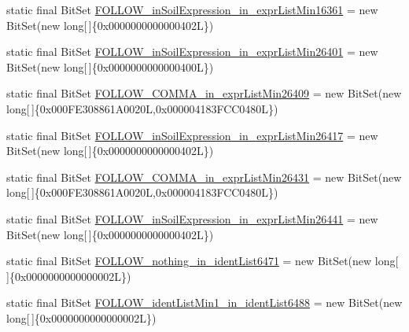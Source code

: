 \begin{DoxyCompactItemize}
\item 
static final Bit\-Set \hyperlink{classorg_1_1tzi_1_1use_1_1parser_1_1testsuite_1_1_test_suite_parser_a8cc374ee42374865727cdbff6e6c8eeb}{F\-O\-L\-L\-O\-W\-\_\-in\-Soil\-Expression\-\_\-in\-\_\-expr\-List\-Min16361} = new Bit\-Set(new long\mbox{[}$\,$\mbox{]}\{0x0000000000000402\-L\})
\item 
static final Bit\-Set \hyperlink{classorg_1_1tzi_1_1use_1_1parser_1_1testsuite_1_1_test_suite_parser_a00e66593897b9c392eba032f7b741046}{F\-O\-L\-L\-O\-W\-\_\-in\-Soil\-Expression\-\_\-in\-\_\-expr\-List\-Min26401} = new Bit\-Set(new long\mbox{[}$\,$\mbox{]}\{0x0000000000000400\-L\})
\item 
static final Bit\-Set \hyperlink{classorg_1_1tzi_1_1use_1_1parser_1_1testsuite_1_1_test_suite_parser_a2014b1958ea3d9eefd2b0a3adbc00fb4}{F\-O\-L\-L\-O\-W\-\_\-\-C\-O\-M\-M\-A\-\_\-in\-\_\-expr\-List\-Min26409} = new Bit\-Set(new long\mbox{[}$\,$\mbox{]}\{0x000\-F\-E308861\-A0020\-L,0x000004183\-F\-C\-C0480\-L\})
\item 
static final Bit\-Set \hyperlink{classorg_1_1tzi_1_1use_1_1parser_1_1testsuite_1_1_test_suite_parser_a28efb90b184b3e10d31ee5487999b799}{F\-O\-L\-L\-O\-W\-\_\-in\-Soil\-Expression\-\_\-in\-\_\-expr\-List\-Min26417} = new Bit\-Set(new long\mbox{[}$\,$\mbox{]}\{0x0000000000000402\-L\})
\item 
static final Bit\-Set \hyperlink{classorg_1_1tzi_1_1use_1_1parser_1_1testsuite_1_1_test_suite_parser_aa237ad2d9807f0a9d51e3a8c4900b31b}{F\-O\-L\-L\-O\-W\-\_\-\-C\-O\-M\-M\-A\-\_\-in\-\_\-expr\-List\-Min26431} = new Bit\-Set(new long\mbox{[}$\,$\mbox{]}\{0x000\-F\-E308861\-A0020\-L,0x000004183\-F\-C\-C0480\-L\})
\item 
static final Bit\-Set \hyperlink{classorg_1_1tzi_1_1use_1_1parser_1_1testsuite_1_1_test_suite_parser_a5b71de680f66b17a9510c1af8640cf6c}{F\-O\-L\-L\-O\-W\-\_\-in\-Soil\-Expression\-\_\-in\-\_\-expr\-List\-Min26441} = new Bit\-Set(new long\mbox{[}$\,$\mbox{]}\{0x0000000000000402\-L\})
\item 
static final Bit\-Set \hyperlink{classorg_1_1tzi_1_1use_1_1parser_1_1testsuite_1_1_test_suite_parser_a983383a4d726bc53b64045f1c02035a0}{F\-O\-L\-L\-O\-W\-\_\-nothing\-\_\-in\-\_\-ident\-List6471} = new Bit\-Set(new long\mbox{[}$\,$\mbox{]}\{0x0000000000000002\-L\})
\item 
static final Bit\-Set \hyperlink{classorg_1_1tzi_1_1use_1_1parser_1_1testsuite_1_1_test_suite_parser_a51e82f464e2b6ece15ef6e5d49e2e4a2}{F\-O\-L\-L\-O\-W\-\_\-ident\-List\-Min1\-\_\-in\-\_\-ident\-List6488} = new Bit\-Set(new long\mbox{[}$\,$\mbox{]}\{0x0000000000000002\-L\})

\end{DoxyCompactItemize}
